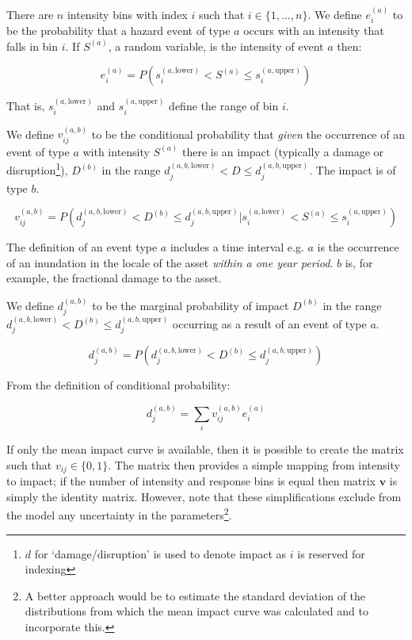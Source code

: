 \documentclass[a4paper,11pt]{extarticle} %
\begin{document}
There are $n$ intensity bins with index $i$ such that $i \in \{1, \dots, n \}$. We define $e^{(a)}_i$ to be the probability that a hazard event of type $a$ occurs with an intensity that falls in bin $i$. If $S^{(a)}$, a random variable, is the intensity of event $a$ then: 

\begin{equation}
	\label{Eq:event}  
	e^{(a)}_i = P \left( s^{(a, \text{lower})}_i < S^{(a)} \le s^{(a, \text{upper})}_i \right)
\end{equation}  

That is, $s^{(a, \text{lower})}_i$ and $s^{(a, \text{upper})}_i$ define the range of bin $i$.

We define $v^{(a, b)}_{ij}$ to be the conditional probability that \emph{given} the occurrence of an event of type $a$ with intensity $S^{(a)}$ there is an impact (typically a damage or disruption\footnote{$d$ for `damage/disruption' is used to denote impact as $i$ is reserved for indexing}), $D^{(b)}$ in the range $d^{(a,b,\text{lower})}_j < D \le d^{(a,b,\text{upper})}_j$. The impact is of type $b$. 


\begin{equation}
	\label{Eq:vulnerability}  
	v^{(a, b)}_{ij} = P \left( d^{(a,b,\text{lower})}_j < D^{(b)} \le d^{(a,b,\text{upper})}_j | s^{(a, \text{lower})}_i < S^{(a)} \le s^{(a, \text{upper})}_i \right)
\end{equation} 

The definition of an event type $a$ includes a time interval e.g. $a$ is the occurrence of an inundation in the locale of the asset {\it within a one year period}. $b$ is, for example, the fractional damage to the asset.

We define $d^{(a,b)}_j$ to be the marginal probability of impact $D^{(b)}$ in the range $d^{(a,b, \text{lower})}_j < D^{(b)} \le d^{(a,b,\text{upper})}_j$ occurring as a result of an event of type $a$. 

\begin{equation}
	\label{Eq:impact}  
	d^{(a,b)}_j = P \left( d^{(a,b,\text{lower})}_j < D^{(b)} \le d^{(a,b,\text{upper})}_j \right)
\end{equation} 

From the definition of conditional probability:

\begin{equation}
	\label{Eq:model}
	d^{(a,b)}_j = \sum_{i} v^{(a,b)}_{ij} e^{(a)}_i
\end{equation}

If only the mean impact curve is available, then it is possible to create the matrix such that $v_{ij} \in \{0, 1\}$. The matrix then provides a simple mapping from intensity to impact; if the number of intensity and response bins is equal then matrix $\mathbf{v}$ is simply the identity matrix. However, note that these simplifications exclude from the model any uncertainty in the parameters\footnote{A better approach would be to estimate the standard deviation of the distributions from which the mean impact curve was calculated and to incorporate this.}.
\end{document}
